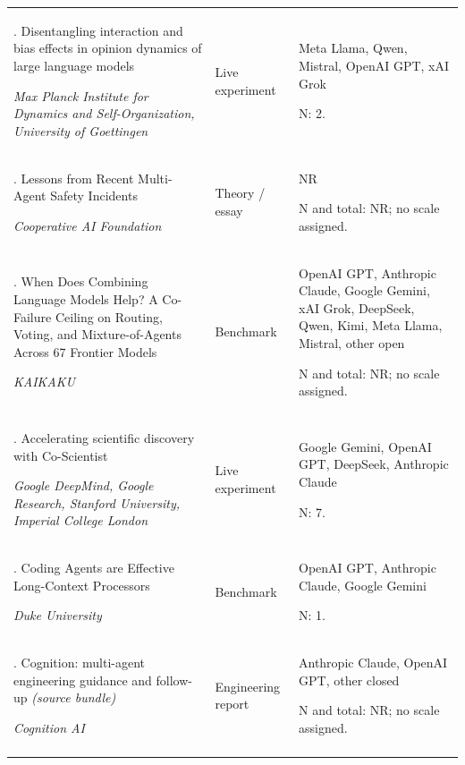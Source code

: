 \begin{longtable}{@{}>{\raggedright\arraybackslash}p{}>{\raggedright\arraybackslash}p{}>{\raggedright\arraybackslash}p{}@{}}
47. Disentangling interaction and bias effects in opinion dynamics of large language models \citep{brockers-opinion-dynamics}\par\emph{Max Planck Institute for Dynamics and Self-Organization, University of Goettingen} & Live experiment & Meta Llama, Qwen, Mistral, OpenAI GPT, xAI Grok\par N: 2. \\ \addlinespace[2pt]
48. Lessons from Recent Multi-Agent Safety Incidents \citep{caif-lessons}\par\emph{Cooperative AI Foundation} & Theory / essay & NR\par N and total: NR; no scale assigned. \\ \addlinespace[2pt]
49. When Does Combining Language Models Help? A Co-Failure Ceiling on Routing, Voting, and Mixture-of-Agents Across 67 Frontier Models \citep{co-failure-ceiling}\par\emph{KAIKAKU} & Benchmark & OpenAI GPT, Anthropic Claude, Google Gemini, xAI Grok, DeepSeek, Qwen, Kimi, Meta Llama, Mistral, other open\par N and total: NR; no scale assigned. \\ \addlinespace[2pt]
50. Accelerating scientific discovery with Co-Scientist \citep{co-scientist-nature}\par\emph{Google DeepMind, Google Research, Stanford University, Imperial College London} & Live experiment & Google Gemini, OpenAI GPT, DeepSeek, Anthropic Claude\par N: 7. \\ \addlinespace[2pt]
51. Coding Agents are Effective Long-Context Processors \citep{coding-agents-long-context}\par\emph{Duke University} & Benchmark & OpenAI GPT, Anthropic Claude, Google Gemini\par N: 1. \\ \addlinespace[2pt]
52. Cognition: multi-agent engineering guidance and follow-up \emph{(source bundle)} \citep{cognition-dont-build-multi-agents,cognition-multi-agents-working}\par\emph{Cognition AI} & Engineering report & Anthropic Claude, OpenAI GPT, other closed\par N and total: NR; no scale assigned. \\ \addlinespace[2pt]

\end{longtable}
